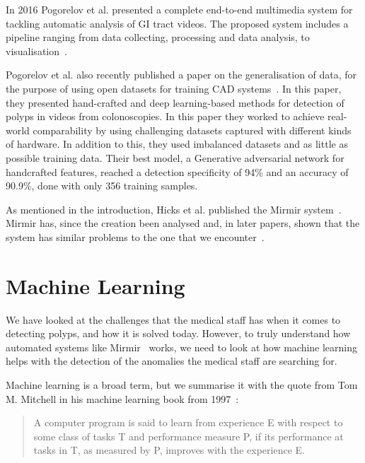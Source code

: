 In 2016 Pogorelov et al. presented a complete end-to-end multimedia system for tackling automatic analysis of GI tract videos. The proposed system includes a pipeline ranging from data collecting, processing and data analysis, to visualisation~\cite{Pogorelov2017}. 

Pogorelov et al. also recently published a paper on the generalisation of data, for the purpose of using open datasets for training CAD systems~\cite{pogorelov2018deep}. In this paper, they presented hand-crafted and deep learning-based methods for detection of polyps in videos from colonoscopies. In this paper they worked to achieve real-world comparability by using challenging datasets captured with different kinds of hardware. In addition to this, they used imbalanced datasets and as little as possible training data.
Their best model, a Generative adversarial network for handcrafted features, reached a detection specificity of 94\% and an accuracy of 90.9\%, done with only 356 training samples.

As mentioned in the introduction, Hicks et al. published the Mirmir system~\cite{25953}. 
Mirmir has, since the creation been analysed and, in later papers, shown that the system has similar problems to the one that we encounter~\cite{25956}.  



    
\section{Machine Learning}
We have looked at the challenges that the medical staff has when it comes to detecting polyps, and how it is solved today.
However, to truly understand how automated systems like Mirmir~\cite{25953} works, we need to look at how machine learning helps with the detection of the anomalies the medical staff are searching for.  

Machine learning is a broad term, but we summarise it with the quote from  Tom M. Mitchell in his machine learning book from 1997~\cite{MitchellTomM1997Ml}:\\
\vspace{10px}

\begin{minipage}{\linewidth}
\begin{quote}
 A computer program is said to learn from experience E with respect to some class of tasks T and performance measure P, if its performance at tasks in T, as measured by P, improves with the experience E.
\end{quote} 
\label{ML}
\end{minipage}



